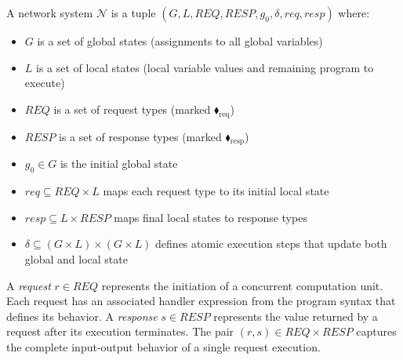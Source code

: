    
A network system $\mathcal{N}$ is a tuple $(G, L, \mathit{REQ}, \mathit{RESP}, g_0, \delta, \mathit{req}, \mathit{resp})$ where:
\begin{itemize}
\item $G$ is a set of global states (assignments to all global variables)
\item $L$ is a set of local states (local variable values and remaining program to execute)
\item $\mathit{REQ}$ is a set of request types (marked {\color{ForestGreen}$\blacklozenge_\text{req}$})
\item $\mathit{RESP}$ is a set of response types (marked {\color{red}$\blacklozenge_\text{resp}$})
\item $g_0 \in G$ is the initial global state
\item $\mathit{req} \subseteq \mathit{REQ} \times L$ maps each request type to its initial local state
\item $\mathit{resp} \subseteq L \times \mathit{RESP}$ maps final local states to response types
\item $\delta \subseteq (G \times L) \times (G \times L)$ defines atomic execution steps that update both global and local state
\end{itemize}

\begin{definition}
A \emph{request} $r \in \mathit{REQ}$ represents the initiation of a concurrent computation unit. Each request has an associated handler expression from the program syntax that defines its behavior.
A \emph{response} $s \in \mathit{RESP}$ represents the value returned by a request after its execution terminates.
The pair $(r, s) \in \mathit{REQ} \times \mathit{RESP}$ captures the complete input-output behavior of a single request execution.
\end{definition}




